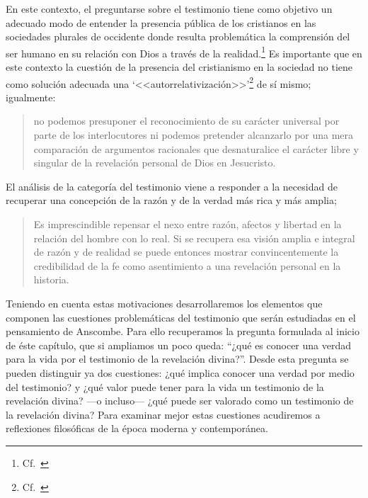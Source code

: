 En este contexto, el preguntarse sobre el testimonio tiene como objetivo un
adecuado modo de entender la presencia pública de los cristianos en las
sociedades plurales de occidente donde resulta problemática la comprensión del
ser humano en su relación con Dios a través de la
realidad.\footnote{Cf.~\cite[75]{prades2015testimonio}} Es importante que en
este contexto la cuestión de la presencia del cristianismo en la sociedad no
tiene como solución adecuada una
\enquote*{<<autorrelativización>>}\footnote{Cf.~\cite[75;\,40--44]{prades2015testimonio}}
de sí mismo; igualmente:
\blockquote[{\cite[75; Cf.~33--40]{prades2015testimonio}}]{no podemos presuponer
  el reconocimiento de su carácter universal por parte de los interlocutores ni
  podemos pretender alcanzarlo por una mera comparación de argumentos racionales
  que desnaturalice el carácter libre y singular de la revelación personal de
  Dios en Jesucristo.}
El análisis de la categoría del testimonio viene a responder a la necesidad de
recuperar una concepción de la razón y de la verdad más rica y más amplia;
\blockquote[{\cite[76]{prades2015testimonio}}]{Es imprescindible repensar el
  nexo entre razón, afectos y libertad en la relación del hombre con lo real. Si
  se recupera esa visión amplia e integral de razón y de realidad se puede
  entonces mostrar convincentemente la credibilidad de la fe como asentimiento a
  una revelación personal en la historia.}

Teniendo en cuenta estas motivaciones desarrollaremos los elementos que componen
las cuestiones problemáticas del testimonio que serán estudiadas en el
pensamiento de Anscombe. Para ello recuperamos la pregunta formulada al inicio
de éste capítulo, que si ampliamos un poco queda: \enquote{¿qué es conocer una
  verdad para la vida por el testimonio de la revelación divina?}.
Desde esta pregunta se pueden distinguir ya dos cuestiones: ¿qué implica conocer
una verdad por medio del testimonio? y ¿qué valor puede tener para la vida un
testimonio de la revelación divina? ---o incluso--- ¿qué puede ser valorado como
un testimonio de la revelación divina? Para examinar mejor estas cuestiones
acudiremos a reflexiones filosóficas de la época moderna y contemporánea.

